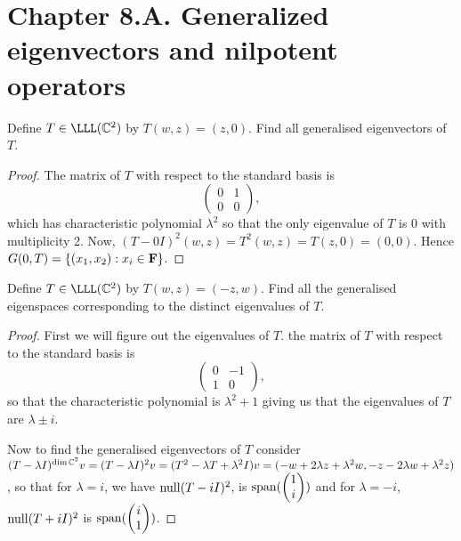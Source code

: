 \section*{Chapter 8.A. Generalized eigenvectors and nilpotent operators}


\begin{exercise}{1}
  Define $T\in\LLL(\C^2)$ by $T(w,z)=(z,0)$. Find all generalised eigenvectors of $T$.
\end{exercise}
\begin{proof}
 The matrix of $T$ with respect to the standard basis is
 \[
 \begin{pmatrix}
     0 & 1\\
     0 & 0
 \end{pmatrix},
 \]
 which has characteristic polynomial $\lambda^2$ so that the only eigenvalue of $T$ is 0 with multiplicity 2. Now, $(T-0I)^2(w,z) =T^2(w,z) =T(z,0) =(0,0)$. Hence $G(0,T)=\{(x_1,x_2):x_i\in \mathbf{F}\}$.
\end{proof}

\begin{exercise}{2}
  Define $T\in\LLL(\C^2)$ by $T(w,z)=(-z,w)$. Find all the generalised eigenspaces corresponding to the distinct eigenvalues of $T$.
\end{exercise}
\begin{proof}
 First we will figure out the eigenvalues of $T$. the matrix of $T$ with respect to the standard basis is
 \[
 \begin{pmatrix}
     0 & -1\\
     1 & 0
 \end{pmatrix},
 \]
 so that the characteristic polynomial is $\lambda^2+1$ giving us that the eigenvalues of $T$ are $\lambda \pm i$. 
 
 Now to find the generalised eigenvectors of $T$ consider $(T-\lambda I)^{\dim \mathbb{C}^2}v =(T-\lambda I)^2v =(T^2 -\lambda T +\lambda^2 I)v = (-w +2\lambda z+\lambda^2 w, -z-2\lambda w +\lambda^2 z)$, so that for $\lambda = i$, we have $\operatorname*{null} (T-iI)^2$, is $\operatorname*{span}(\begin{pmatrix}
     1\\
     i
 \end{pmatrix})$ and for $\lambda =-i$, $\operatorname*{null} (T+iI)^2$ is $\operatorname*{span}(\begin{pmatrix}
     i\\
     1
 \end{pmatrix})$.
\end{proof}

